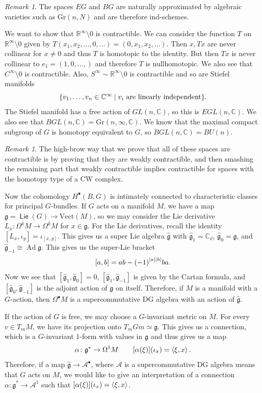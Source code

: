 \documentclass[leqno, openany]{memoir}
\theoremstyle{definition}
\theoremstyle{remark}
\newtheorem{rmk}[thm]{Remark}
\theoremstyle{plain}
\theoremstyle{definition}
\theoremstyle{remark}
\newcommand{\R}{\mathbb{R}}
\newcommand{\C}{\mathbb{C}}
\newcommand{\mf}[1]{\mathfrak{#1}}
\newcommand{\mr}[1]{\mathrm{#1}}
\newcommand{\wh}[1]{\widehat{#1}}
\newcommand{\msc}[1]{\mathscr{#1}}
\DeclareMathOperator{\Ad}{Ad}
\DeclareMathOperator{\Lie}{\mathsf{Lie}}
\begin{document}
\begin{rmk}
    The spaces $EG$ and $BG$ are naturally approximated by algebraic varieties such as $\mr{Gr}(n, N)$ and are therefore ind-schemes.
\end{rmk}

We want to show that $\R^{\infty} \setminus 0$ is contractible. We can consider the function $T$ on $\R^{\infty} \setminus 0$ given by $T(x_1, x_2, \ldots, 0, \ldots) = (0, x_1, x_2, \ldots)$. Then $x, Tx$ are never collinear for $x \neq 0$ and thus $T$ is homotopic to the identity. But then $Tx$ is never collinear to $e_1 = (1, 0, \ldots,)$ and therefore $T$ is nullhomotopic. We also see that $C^{\infty} \setminus 0$ is contractible. Also, $S^{\infty} \sim \R^{\infty} \setminus 0$ is contractible and so are Stiefel manifolds
\[ \qty{v_1, \ldots, v_n \in \C^{\infty} \mid v_i\ \text{are linearly independent}}. \]
The Stiefel manifold has a free action of $GL(n, \C)$, so this is $EGL(n, \C)$. We also see that $BGL(n, \C) = \mr{Gr}(n, \infty, \C)$. We know that the maximal compact subgroup of $G$ is homotopy equivalent to $G$, so $BGL(n, \C) = BU(n)$.

\begin{rmk}
    The high-brow way that we prove that all of these spaces are contractible is by proving that they are weakly contractible, and then smashing the remaining part that weakly contractible implies contractible for spaces with the homotopy type of a CW complex.
\end{rmk}

Now the cohomology $H^{\bullet}(B, G)$ is intimately connected to characteristic classes for principal $G$-bundles. If $G$ acts on a manifold $M$, we have a map $\mf{g} = \Lie(G) \to \mr{Vect}(M)$, so we may consider the Lie derivative $L_x \colon \Omega^k M \to \Omega^k M$ for $x \in \mf{g}$. For the Lie derivatives, recall the identity $[L_x, \iota_y] = \iota_{[x,y]}$. This gives us a super Lie algebra $\wh{\mf{g}}$ with $\wh{\mf{g}}_1 = \C_{\dd}$, $\wh{\mf{g}}_0 = \mf{g}$, and $\wh{\mf{g}}_{-1} \cong \Ad \mf{g}$. This gives us the super-Lie bracket
\[ [a,b] = ab - {(-1)}^{\abs{a} \abs{b}} ba. \]
Now we see that $[\wh{\mf{g}}_1, \wh{\mf{g}}_0] = 0$, $[\wh{\mf{g}}_1, \wh{\mf{g}}_{-1}]$ is given by the Cartan formula, and $[\wh{\mf{g}}_0, \wh{\mf{g}}_{-1}]$ is the adjoint action of $\mf{g}$ on itself. Therefore, if $M$ is a manifold with a $G$-action, then $\Omega^{\bullet} M$ is a supercommutative DG algebra with an action of $\wh{\mf{g}}$.

If the action of $G$ is free, we may choose a $G$-invariant metric on $M$. For every $v \in T_m M$, we have its projection onto $T_m Gm \simeq \mf{g}$. This gives us a connection, which is a $G$-invariant $1$-form with values in $\mf{g}$ and thus gives us a map 
\[ \alpha \colon \mf{g}^* \to \Omega^1 M \qquad [\alpha(\xi)] (\iota_x) = \ev{\xi, x}. \]
Therefore, if a map $\wh{\mf{g}} \to \msc{A}^{\bullet}$, where $\msc{A}$ is a supercommutative DG algebra means that $G$ acts on $M$, we would like to give an interpretation of a connection $\alpha \colon \mf{g}^* \to \msc{A}^1$ such that $[\alpha(\xi)] (\iota_x) = \ev{\xi, x}$.
\end{document}

